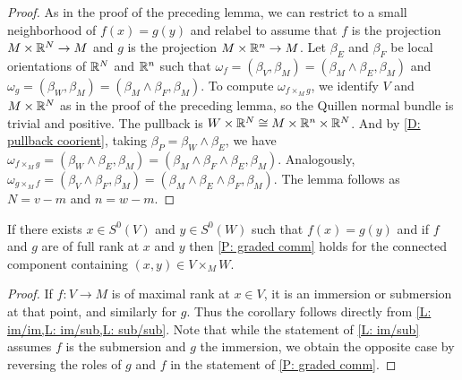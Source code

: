 \begin{proof}
	As in the proof of the preceding lemma, we can restrict to a small neighborhood of $f(x) = g(y)$ and relabel to assume that $f$ is the projection $M \times \mathbb{R}^N \to M$ and $g$ is the projection $M \times \mathbb{R}^n \to M$.
	Let $\beta_E$ and $\beta_F$ be local orientations of $\mathbb{R}^N$ and $\mathbb{R}^n$ such that $\omega_f = (\beta_V,\beta_M) = (\beta_M \wedge \beta_E, \beta_M)$ and $\omega_g = (\beta_W,\beta_M) = (\beta_M \wedge \beta_F, \beta_M)$.
	To compute $\omega_{f \times_M g}$, we identify $V$ and $M \times \mathbb{R}^N$ as in the proof of the preceding lemma, so the Quillen normal bundle is trivial and positive.
	The pullback is $W \times \mathbb{R}^N \cong M \times \mathbb{R}^n \times \mathbb{R}^N$.
	And by \cref{D: pullback coorient}, taking $\beta_P = \beta_W \wedge \beta_E$, we have $\omega_{f \times_M g} = (\beta_W \wedge \beta_E, \beta_M) = (\beta_M \wedge \beta_F \wedge \beta_E, \beta_M)$.
	Analogously, $\omega_{g \times_M f} = (\beta_V \wedge \beta_F, \beta_M) = (\beta_M \wedge \beta_E \wedge \beta_F, \beta_M)$.
	The lemma follows as $N = v-m$ and $n = w-m$.
\end{proof}

\begin{corollary}\label{C: if full}
	If there exists $x \in S^0(V)$ and $y \in S^0(W)$ such that $f(x) = g(y)$ and if $f$ and $g$ are of full rank at $x$ and $y$ then \cref{P: graded comm} holds for the connected component containing $(x,y) \in V \times_M W$.
\end{corollary}

\begin{proof}
	If $f \colon V \to M$ is of maximal rank at $x \in V$, it is an immersion or submersion at that point, and similarly for $g$.
	Thus the corollary follows directly from \cref{L: im/im,L: im/sub,L: sub/sub}.
	Note that while the statement of \cref{L: im/sub} assumes $f$ is the submersion and $g$ the immersion, we obtain the opposite case by reversing the roles of $g$ and $f$ in the statement of \cref{P: graded comm}.
\end{proof}

\begin{comment}
	If they are both immersions, apply Lemma \ref{L: im/im}.
	If $f$ is a submersion, it is also a submersion in a neighborhood of $U$ and so it is a submersion on a neighborhood $U$ of $x$.
	Let $A$ be the intersection of $U$ with the interior of $V$.
	By the transversality of $f$ and $g$, if $g(y) = f(x)$, there must be points in a neighborhood of $B$ of $y$ in $W$ that map to $f(A)$, and as a map is a submersion or immersion on an open set, there is a $y'$ in the interior of $B$ that maps to $f(A)$.
	Taking $x'$ in $f^{-1}(y')$, if $g$ is an immersion we apply Lemma \ref{L: im/sub} to $x', y'$, and if $g$ is a submersion we apply Lemma \ref{L: sub/sub}.
	If $f$ is an immersion and $g$ a submersion, we reverse the roles in the argument.
\end{comment}

